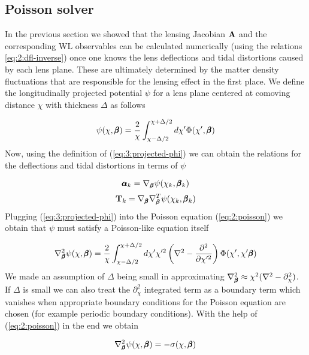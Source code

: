 \subsection{Poisson solver}
In the previous section we showed that the lensing Jacobian $\mathbf{A}$ and the corresponding WL observables can be calculated numerically (using the relations \ref{eq:2:dfl-inverse}) once one knows the lens deflections and tidal distortions caused by each lens plane. These are ultimately determined by the matter density fluctuations that are responsible for the lensing effect in the first place. We define the longitudinally projected potential $\psi$ for a lens plane centered at comoving distance $\chi$ with thickness $\Delta$ as follows

\begin{equation}
\label{eq:3:projected-phi}
\psi(\chi,\pmb{\beta}) = \frac{2}{\chi}\int_{\chi-\Delta/2}^{\chi+\Delta/2}d\chi' \Phi(\chi',\pmb{\beta})
\end{equation} 
%
Now, using the definition of (\ref{eq:3:projected-phi}) we can obtain the relations for the deflections and tidal distortions in terms of $\psi$

\begin{equation}
\label{eq:3:alphak-psi}
\pmb{\alpha}_k = \nabla_{\pmb{\beta}}\psi(\chi_k,\pmb{\beta}_k)
\end{equation}
%
\begin{equation}
\label{eq:3:Tk-psi}
\mathbf{T}_k = \nabla_{\pmb{\beta}}\nabla^T_{\pmb{\beta}}\psi(\chi_k,\pmb{\beta}_k)
\end{equation}
%
Plugging (\ref{eq:3:projected-phi}) into the Poisson equation (\ref{eq:2:poisson}) we obtain that $\psi$ must satisfy a Poisson-like equation itself

\begin{equation}
\label{eq:3:poisson-psi-1}
\nabla^2_{\pmb{\beta}}\psi(\chi,\pmb{\beta}) = \frac{2}{\chi}\int_{\chi-\Delta/2}^{\chi+\Delta/2}d\chi' \chi'^2\left(\nabla^2-\frac{\partial^2}{\partial \chi'^2}\right)\Phi(\chi',\chi'\pmb{\beta})
\end{equation}
%
We made an assumption of $\Delta$ being small in approximating $\nabla^2_{\pmb{\beta}}\approx \chi^2(\nabla^2-\partial_\chi^2)$. If $\Delta$ is small we can also treat the $\partial^2_\chi$ integrated term as a boundary term which vanishes when appropriate boundary conditions for the Poisson equation are chosen (for example periodic boundary conditions). With the help of (\ref{eq:2:poisson}) in the end we obtain

\begin{equation}
\label{eq:3:poisson-psi-2}
\nabla^2_{\pmb{\beta}}\psi(\chi,\pmb{\beta}) = -\sigma(\chi,\pmb{\beta})  
\end{equation} 

